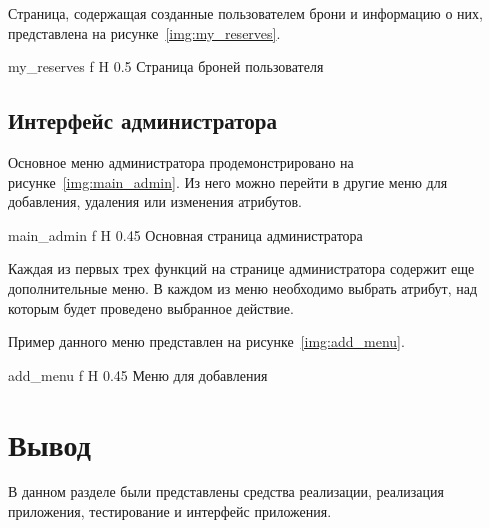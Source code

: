 Страница, содержащая созданные пользователем брони и информацию о них, представлена на рисунке~\ref{img:my_reserves}.

{my_reserves} %
{f} %
{H} %
{0.5\textwidth} %
{Страница броней пользователя} %


\subsection{Интерфейс администратора}
Основное меню администратора продемонстрировано на рисунке~\ref{img:main_admin}.
Из него можно перейти в другие меню для добавления, удаления или изменения атрибутов.


{main_admin} %
{f} %
{H} %
{0.45\textwidth} %
{Основная страница администратора} %

Каждая из первых трех функций на странице администратора содержит еще дополнительные меню.
В каждом из меню необходимо выбрать атрибут, над которым будет проведено выбранное действие.

Пример данного меню представлен на рисунке~\ref{img:add_menu}.

{add_menu} %
{f} %
{H} %
{0.45\textwidth} %
{Меню для добавления} %


\section*{Вывод}
В данном разделе были представлены средства реализации, реализация приложения, тестирование и интерфейс приложения.

